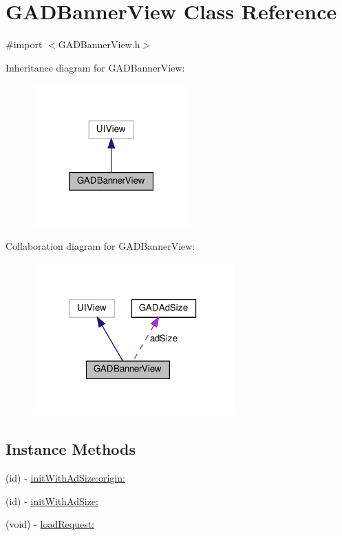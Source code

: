 \hypertarget{interfaceGADBannerView}{}\section{G\+A\+D\+Banner\+View Class Reference}
\label{interfaceGADBannerView}


{\ttfamily \#import $<$G\+A\+D\+Banner\+View.\+h$>$}



Inheritance diagram for G\+A\+D\+Banner\+View\+:
\nopagebreak
\begin{figure}[H]
\begin{center}
\leavevmode
\includegraphics[width=171pt]{interfaceGADBannerView__inherit__graph}
\end{center}
\end{figure}


Collaboration diagram for G\+A\+D\+Banner\+View\+:
\nopagebreak
\begin{figure}[H]
\begin{center}
\leavevmode
\includegraphics[width=218pt]{interfaceGADBannerView__coll__graph}
\end{center}
\end{figure}
\subsection*{Instance Methods}
\begin{DoxyCompactItemize}
\item 
(id) -\/ \hyperlink{interfaceGADBannerView_a567c96091c9e7f1e3c1a86c3c85f03fa}{init\+With\+Ad\+Size\+:origin\+:}
\item 
(id) -\/ \hyperlink{interfaceGADBannerView_a5abf339e966c5be6ca60fb87328dab39}{init\+With\+Ad\+Size\+:}
\item 
(void) -\/ \hyperlink{interfaceGADBannerView_aae670f6f24b63f844440305f9d22b420}{load\+Request\+:}
\end{DoxyCompactItemize}
